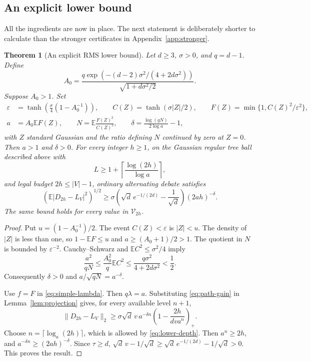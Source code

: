 \documentclass[11pt]{article}
\newtheorem{theorem}{Theorem}[section]
\theoremstyle{definition}
\theoremstyle{remark}
\newcommand{\E}{\mathbb E}
\newcommand{\Vcl}{\mathcal V}
\newcommand{\err}{|D_{2h}-L_V|}
\begin{document}
\subsection{An explicit lower bound}
All the ingredients are now in place. The next statement is deliberately
shorter to calculate than the stronger certificates in
Appendix~\ref{app:stronger}.

\begin{theorem}[An explicit RMS lower bound]
\label{thm:lower}
Let $d\ge3$, $\sigma>0$, and $q=d-1$. Define
\[
 A_0=\frac{q\exp(-(d-2)\sigma^2/(4+2d\sigma^2))}
                   {\sqrt{1+d\sigma^2/2}}.
\]
Suppose $A_0>1$. Set
\begin{align*}
 \varepsilon&=\tanh\left(\frac\sigma4(1-A_0^{-1})\right),\qquad
 C(Z)=\tanh(\sigma|Z|/2),\qquad
 F(Z)=\min\{1,C(Z)^2/\varepsilon^2\},\\
 a&=A_0\E F(Z),\qquad
 N=\E\frac{F(Z)^2}{C(Z)^2},\qquad
 \delta=\frac{\log(qN)}{2\log a}-1,
\end{align*}
with $Z$ standard Gaussian and the ratio defining $N$ continued by zero
at $Z=0$. Then $a>1$ and $\delta>0$.
For every integer $h\ge1$, on the Gaussian regular tree ball described
above with
\begin{equation}
 L\ge1+\left\lceil\frac{\log(2h)}{\log a}\right\rceil,
 \label{eq:lower-depth}
\end{equation}
and legal budget $2h\le |V|-1$, ordinary alternating debate satisfies
\begin{equation}
 \boxed{(\E\err^2)^{1/2}\ge
 \sigma\left(\sqrt d\,e^{-1/(2d)}-\frac1{\sqrt d}\right)(2ah)^{-\delta}.}
 \label{eq:lower}
\end{equation}
The same bound holds for every value in $\Vcl_{2h}$.
\end{theorem}
\begin{proof}
Put $u=(1-A_0^{-1})/2$. The event $C(Z)<\varepsilon$ is $|Z|<u$.
The density of $|Z|$ is less than one, so
$1-\E F\le u$ and $a\ge(A_0+1)/2>1$.
The quotient in $N$ is bounded by $\varepsilon^{-2}$. Cauchy--Schwarz and
$\E C^2\le\sigma^2/4$ imply
\[
 \frac{a^2}{qN}
 \le\frac{A_0^2}{q}\E C^2
 \le\frac{q\sigma^2}{4+2d\sigma^2}<\frac12.
\]
Consequently $\delta>0$ and $a/\sqrt{qN}=a^{-\delta}$.

Use $f=F$ in \eqref{eq:simple-lambda}. Then $q\lambda=a$.
Substituting \eqref{eq:path-gain} in Lemma~\ref{lem:projection} gives,
for every available level $n+1$,
\begin{equation}
 \|D_{2h}-L_V\|_2\ge
 \sigma\sqrt d\,v\,a^{-\delta n}
            \left(1-\frac{2h}{dv a^n}\right)_+.
 \label{eq:finite-lower}
\end{equation}
Choose $n=\lceil\log_a(2h)\rceil$, which is allowed by
\eqref{eq:lower-depth}. Then $a^n\ge2h$, and
$a^{-\delta n}\ge(2ah)^{-\delta}$. Since $\tau\ge d$,
$\sqrt d\,v-1/\sqrt d\ge\sqrt d\,e^{-1/(2d)}-1/\sqrt d>0$.
This proves the result.
\end{proof}
\end{document}
